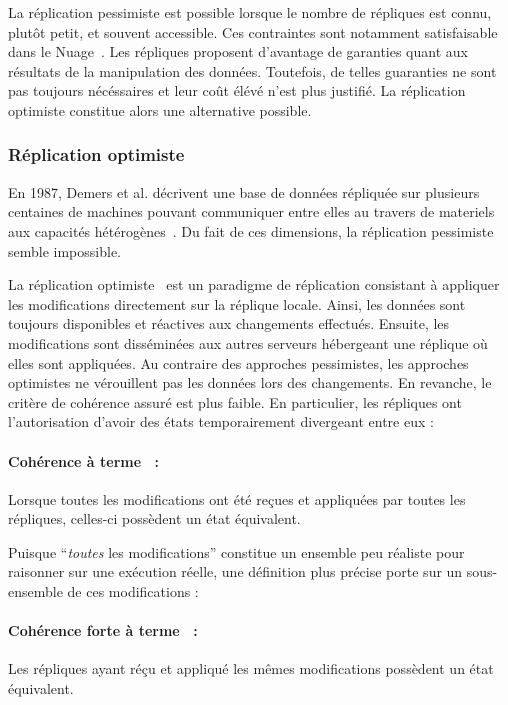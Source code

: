La réplication pessimiste est possible lorsque le nombre de répliques est connu,
plutôt petit, et souvent accessible. Ces contraintes sont notamment
satisfaisable dans le Nuage~\cite{mell2011national}. Les répliques proposent
d'avantage de garanties quant aux résultats de la manipulation des
données. Toutefois, de telles guaranties ne sont pas toujours nécéssaires et
leur coût élévé n'est plus justifié. La réplication optimiste constitue alors
une alternative possible.

\subsubsection{Réplication optimiste}
\label{repl:subsubsec:optimistic}

En 1987, Demers et al. décrivent une base de données répliquée sur plusieurs
centaines de machines pouvant communiquer entre elles au travers de materiels
aux capacités hétérogènes~\cite{demers1987epidemic}. Du fait de ces dimensions,
la réplication pessimiste semble impossible.

La réplication optimiste~\cite{johnson1975maintenance, saito2005optimistic} est
un paradigme de réplication consistant à appliquer les modifications directement
sur la réplique locale.  Ainsi, les données sont toujours disponibles et
réactives aux changements effectués. Ensuite, les modifications sont disséminées
aux autres serveurs hébergeant une réplique où elles sont appliquées. Au
contraire des approches pessimistes, les approches optimistes ne vérouillent pas
les données lors des changements. En revanche, le critère de cohérence assuré
est plus faible. En particulier, les répliques ont l'autorisation d'avoir des
états temporairement divergeant entre eux :


\paragraph{Cohérence à terme~\cite{bailis2013eventual} :} Lorsque toutes les
modifications ont été reçues et appliquées par toutes les répliques, celles-ci
possèdent un état équivalent.

\noindent Puisque ``\emph{toutes} les modifications'' constitue un ensemble peu réaliste
pour raisonner sur une exécution réelle, une définition plus précise porte sur
un sous-ensemble de ces modifications :

\paragraph{Cohérence forte à terme~\cite{shapiro2011conflict} :} Les répliques
ayant réçu et appliqué les mêmes modifications possèdent un état équivalent.


